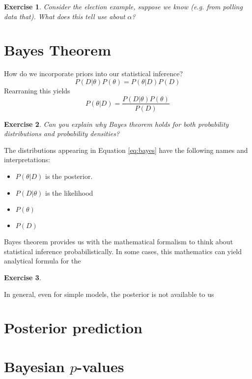 \documentclass{amsart}
\newtheorem{exercise}{Exercise}
\begin{document}
\begin{exercise} Consider the election example, suppose we know (e.g. from polling data that). What does this tell use about $\alpha$? 
\end{exercise}

\section{Bayes Theorem}
How do we incorporate priors into our statistical inference? 
\begin{equation}
P(D|\theta)P(\theta) = P(\theta|D)P(D)
\end{equation}
Rearraning this yields 
\begin{equation}\label{eq:bayes}
P(\theta|D) = \frac{P(D|\theta)P(\theta)}{P(D)}
\end{equation}

\begin{exercise} Can you explain why Bayes theorem holds for both probability distributions and probability densities? 
\end{exercise}
The distributions appearing in Equation \eqref{eq:bayes} have the following names and interpretations: 
\begin{itemize}
\item $P(\theta|D)$ is the posterior.
\item $P(D|\theta)$ is the likelihood 
\item $P(\theta)$
\item $P(D)$
\end{itemize}
Bayes theorem provides us with the mathematical formalism to think about statistical inference probabilistically. In some cases, this mathematics can yield analytical formula for the 

\begin{exercise} 
\end{exercise}

In general, even for simple models, the posterior is not available to us 

\section{Posterior prediction}

\section{Bayesian $p$-values}
\end{document}
